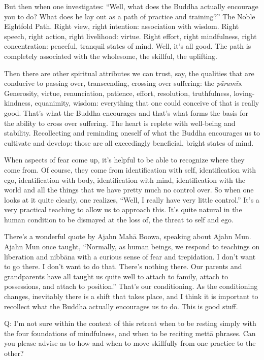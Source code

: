 But then when one investigates: “Well, what does the Buddha actually
encourage you to do? What does he lay out as a path of practice and
training?” The Noble Eightfold Path. Right view, right intention:
association with wisdom. Right speech, right action, right livelihood:
virtue. Right effort, right mindfulness, right concentration: peaceful,
tranquil states of mind. Well, it’s all good. The path is completely
associated with the wholesome, the skillful, the uplifting.

Then there are other spiritual attributes we can trust, say, the
qualities that are conducive to passing over, transcending, crossing
over suffering: the \emph{pāramīs}. Generosity, virtue, renunciation,
patience, effort, resolution, truthfulness, loving-kindness, equanimity,
wisdom: everything that one could conceive of that is really good.
That’s what the Buddha encourages and that’s what forms the basis for
the ability to cross over suffering. The heart is replete with
well-being and stability. Recollecting and reminding oneself of what the
Buddha encourages us to cultivate and develop: those are all exceedingly
beneficial, bright states of mind.

When aspects of fear come up, it’s helpful to be able to recognize where
they come from. Of course, they come from identification with self,
identification with ego, identification with body, identification with
mind, identification with the world and all the things that we have
pretty much no control over. So when one looks at it quite clearly, one
realizes, “Well, I really have very little control.” It’s a very
practical teaching to allow us to approach this. It’s quite natural in
the human condition to be dismayed at the loss of, the threat to self
and ego.

There’s a wonderful quote by Ajahn Mahā Boowa, speaking about Ajahn Mun.
Ajahn Mun once taught, “Normally, as human beings, we respond to
teachings on liberation and nibbāna with a curious sense of fear and
trepidation. I don’t want to go there. I don’t want to do that. There’s
nothing there. Our parents and grandparents have all taught us quite
well to attach to family, attach to possessions, and attach to
position.” That’s our conditioning. As the conditioning changes,
inevitably there is a shift that takes place, and I think it is
important to recollect what the Buddha actually encourages us to do.
This is good stuff.

\qaspace
Q: I’m not sure within the context of this retreat when to be resting
simply with the four foundations of mindfulness, and when to be reciting
mettā phrases. Can you please advise as to how and when to move
skillfully from one practice to the other?

